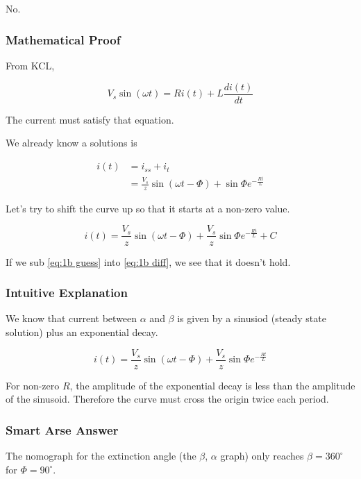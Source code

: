 \subsection{}

No.


\subsubsection*{Mathematical Proof}

From KCL,

\begin{equation}
\label{eq:1b diff}
V_s \sin(\omega t) = R i(t) + L\frac{di(t)}{dt}
\end{equation}

The current must satisfy that equation.

We already know a solutions is

\begin{align*}
i(t) & = i_{ss} + i_t \\
     & = \frac{V_s}{z} \sin(\omega t - \Phi) + \sin{\Phi} e^{-\frac{Rt}{L}}
\end{align*}

Let's try to shift the curve up so that it starts at a non-zero value.

\begin{equation}
\label{eq:1b guess}
i(t) = \frac{V_s}{z} \sin(\omega t - \Phi) + \frac{V_s}{z} \sin{\Phi} e^{-\frac{Rt}{L}} + C
\end{equation}

If we sub \cref{eq:1b guess} into \cref{eq:1b diff}, we see that it doesn't hold.


\subsubsection*{Intuitive Explanation}

We know that current between $\alpha$ and $\beta$ is given by a sinusiod (steady state solution) plus an exponential decay. 

$$
i(t) = \frac{V_s}{z} \sin(\omega t - \Phi) + \frac{V_s}{z} \sin{\Phi} e^{-\frac{Rt}{L}} 
$$

For non-zero $R$, the amplitude of the exponential decay is less than the amplitude of the sinusoid. Therefore the curve must cross the origin twice each period.


\subsubsection*{Smart Arse Answer}

The nomograph for the extinction angle (the $\beta$, $\alpha$ graph) only reaches $\beta{}=360^\circ$ for $\Phi=90^\circ$.